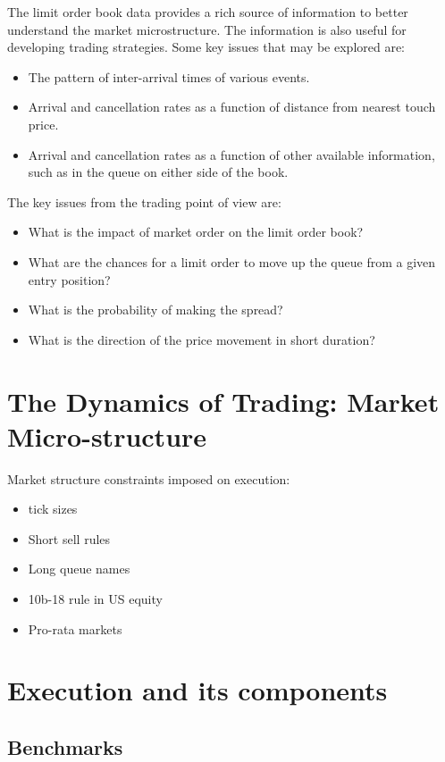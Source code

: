 The limit order book data provides a rich source of information to better understand the market microstructure. The information is also useful for developing trading strategies. Some key issues that may be explored are:

\begin{itemize}
\item The pattern of inter-arrival times of various events.
\item Arrival and cancellation rates as a function of distance from nearest touch price.
\item Arrival and cancellation rates as a function of other available information, such as in the queue on either side of the book.
\end{itemize}

The key issues from the trading point of view are:

\begin{itemize}
\item What is the impact of market order on the limit order book?
\item What are the chances for a limit order to move up the queue from a given entry position?
\item What is the probability of making the spread?
\item What is the direction of the price movement in short duration?
\end{itemize}

\section{The Dynamics of Trading: Market Micro-structure}

Market structure constraints imposed on execution:

\begin{itemize}
\item tick sizes
\item Short sell rules
\item Long queue names
\item 10b-18 rule in US equity
\item Pro-rata markets
\end{itemize}

\section{Execution and its components}
\subsection{Benchmarks}

